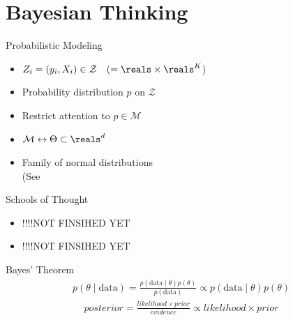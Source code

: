 \section{Bayesian Thinking}

\begin{frame}{Probabilistic Modeling}
  \Large{
  \begin{itemize}
    \item[]  $Z_i = (y_i, X_i) \in \mathcal{Z} \quad (=\reals \times \reals^K$)\pause
    \item[]  Probability distribution $p$ on $\mathcal{Z}$\pause
    \item[]  Restrict attention to $p \in \mathcal{M}$\pause
    \item[]  $\mathcal{M} \leftrightarrow \Theta \subset \reals^d$\pause
    \item[]  Family of normal distributions\pause\\
    \quad\quad\quad\quad (See \pause {}
  \end{itemize}
  }
\end{frame}

\begin{frame}{Schools of Thought}
  \Large{
  \begin{itemize}
    \item[]  !!!!NOT FINSIHED YET
    \item[] !!!!NOT FINSIHED YET
  \end{itemize}
  }
\end{frame}

\begin{frame}{Bayes' Theorem}
  \Large{
    \begin{align*}
      p(\theta \mid \text{data}) = \frac{p(\text{data} \mid \theta) p(\theta)}{p(\text{data})} \propto p(\text{data} \mid \theta) p(\theta)
    \end{align*}\pause
    \vfill
    \begin{align*}
      posterior = \frac{likelihood \times prior}{evidence} \propto likelihood \times prior
    \end{align*}
  }
\end{frame}


